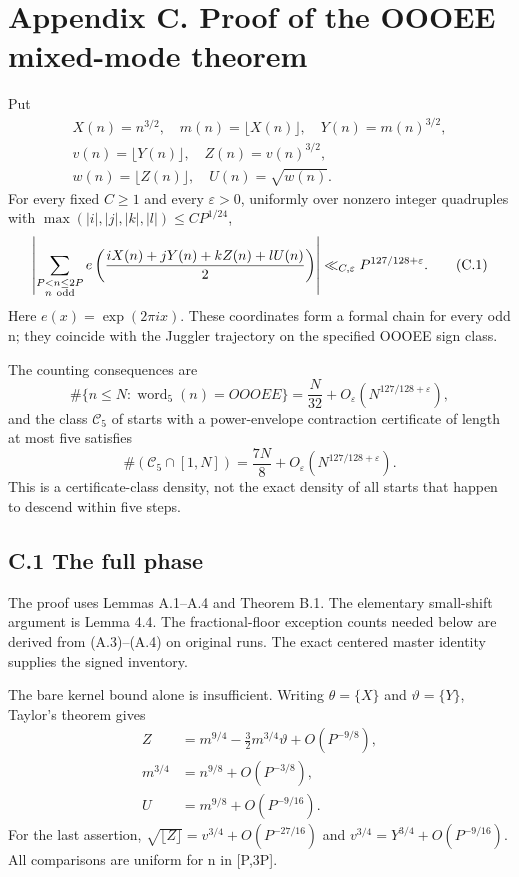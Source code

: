 \documentclass[11pt,a4paper]{article}
\begin{document}
\section{Appendix C. Proof of the OOOEE mixed-mode
theorem}\label{appendix-c.-proof-of-the-oooee-mixed-mode-theorem}

Put \[
\begin{gathered}
X(n)=n^{3/2},\quad m(n)=\lfloor X(n)\rfloor,\quad Y(n)=m(n)^{3/2},\\
v(n)=\lfloor Y(n)\rfloor,\quad Z(n)=v(n)^{3/2},\\
w(n)=\lfloor Z(n)\rfloor,\quad U(n)=\sqrt{w(n)}.
\end{gathered}
\] For every fixed \(C\ge1\) and every \(\varepsilon>0\), uniformly over
nonzero integer quadruples with \(\max(|i|,|j|,|k|,|l|)\le CP^{1/24}\),
\[
\left|\sum_{\substack{P<n\le2P\\n\ {\rm odd}}}
e\left(\frac{iX(n)+jY(n)+kZ(n)+lU(n)}2\right)\right|
\ll_{C,\varepsilon}P^{127/128+\varepsilon}. \tag{C.1}
\] Here \(e(x)=\exp(2\pi i x)\). These coordinates form a formal chain
for every odd n; they coincide with the Juggler trajectory on the
specified OOOEE sign class.

The counting consequences are \[
\#\{n\le N:\operatorname{word}_5(n)=OOOEE\}
=\frac N{32}+O_\varepsilon(N^{127/128+\varepsilon}), \tag{C.2}
\] and the class \(\mathcal C_5\) of starts with a power-envelope
contraction certificate of length at most five satisfies \[
\#(\mathcal C_5\cap[1,N])
=\frac{7N}{8}+O_\varepsilon(N^{127/128+\varepsilon}). \tag{C.3}
\] This is a certificate-class density, not the exact density of all
starts that happen to descend within five steps.

\subsection{C.1 The full phase}\label{c.1-the-full-phase}

The proof uses Lemmas A.1--A.4 and Theorem B.1. The elementary
small-shift argument is Lemma 4.4. The fractional-floor exception counts
needed below are derived from (A.3)--(A.4) on original runs. The exact
centered master identity supplies the signed inventory.

The bare kernel bound alone is insufficient. Writing \(\theta=\{X\}\)
and \(\vartheta=\{Y\}\), Taylor's theorem gives \[
\begin{split}
Z&=m^{9/4}-\tfrac32m^{3/4}\vartheta+O(P^{-9/8}),\\
m^{3/4}&=n^{9/8}+O(P^{-3/8}),\\
U&=m^{9/8}+O(P^{-9/16}).
\end{split}\tag{C.4}
\] For the last assertion,
\(\sqrt{\lfloor Z\rfloor}=v^{3/4}+O(P^{-27/16})\) and
\(v^{3/4}=Y^{3/4}+O(P^{-9/16})\). All comparisons are uniform for n in
{[}P,3P{]}.
\end{document}
